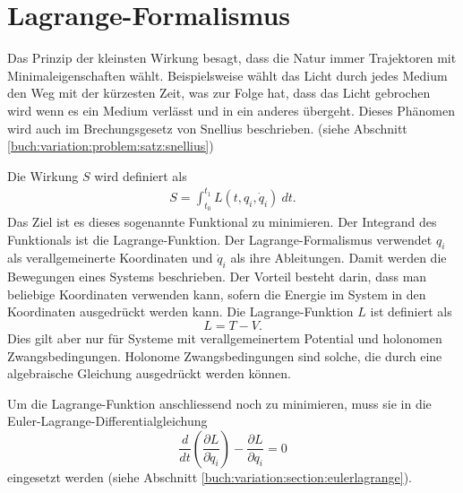 \section{Lagrange-Formalismus}
Das Prinzip der kleinsten Wirkung besagt, dass die Natur immer Trajektoren
mit Minimaleigenschaften wählt.
Beispielsweise wählt das Licht durch jedes Medium den Weg mit der kürzesten Zeit, was zur Folge hat,
dass das Licht gebrochen wird wenn es ein Medium verlässt und in ein anderes übergeht.
Dieses Phänomen wird auch im Brechungsgesetz von Snellius beschrieben.
(siehe Abschnitt \ref{buch:variation:problem:satz:snellius})

Die Wirkung \(S\) wird definiert als
\begin{align*}
    S = \int_{t_0}^{t_1} L(t,q_i,\dot{q}_i) \: dt.
\end{align*}
Das Ziel ist es dieses sogenannte Funktional zu minimieren.
Der Integrand des Funktionals ist die Lagrange-Funktion.
Der Lagrange-Formalismus verwendet \(q_i\) als verallgemeinerte Koordinaten
und \(\dot{q}_i\) als ihre Ableitungen.
Damit werden die Bewegungen eines Systems beschrieben.
Der Vorteil besteht darin, dass man beliebige Koordinaten verwenden kann,
sofern die Energie im System in den Koordinaten ausgedrückt werden kann.
Die Lagrange-Funktion \(L\) ist definiert als
\begin{equation}
    L = T - V.
    \label{eq:lagrange} 
\end{equation}
Dies gilt aber nur für Systeme mit verallgemeinertem Potential und holonomen Zwangsbedingungen.
Holonome Zwangsbedingungen sind solche, die durch eine algebraische Gleichung
ausgedrückt werden können.

Um die Lagrange-Funktion anschliessend noch zu minimieren, muss sie in die
Euler-Lagrange-Differentialgleichung
\begin{equation*}
    \frac{d}{dt} \left( \frac{\partial L}{\partial \dot{q}_i} \right) 
    - \frac{\partial L}{\partial q_i} = 0
\end{equation*}
eingesetzt werden
(siehe Abschnitt \ref{buch:variation:section:eulerlagrange}).




